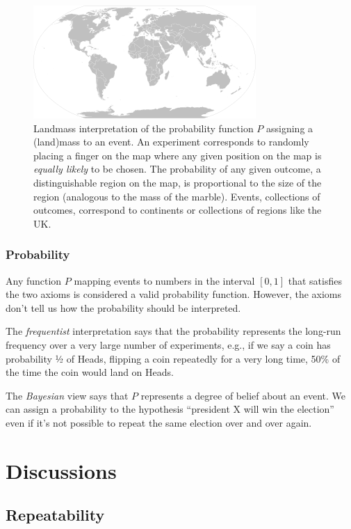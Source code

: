 \begin{figure}[h!]
\centering
\includegraphics[width=0.75\linewidth]{images/figure2}
\caption{%
Landmass interpretation of the probability function \(P\) assigning a (land)mass to an event.
An experiment corresponds to randomly placing a finger on the map where any given position 
on the map is \emph{equally likely} to be chosen. 
The probability of any given outcome, 
a distinguishable region on the map,
is proportional to the size of the region (analogous to the mass of the marble). 
Events, 
collections of outcomes, 
correspond to continents or collections of regions like the UK.
}
\label{fig:landmass}
\end{figure}

\subsubsection{Probability}

Any function \(P\) mapping events to numbers in the interval \([0,1]\) that satisfies the two axioms 
is considered a valid probability function. 
However, 
the axioms don't tell us how the probability should be interpreted.

The \emph{frequentist} interpretation says that the probability
represents the long-run frequency over a very large number of experiments, 
e.g., if we say a coin has probability ½ of Heads, 
flipping a coin repeatedly for a very long time, 
50\% of the time the coin would land on Heads.%

The \emph{Bayesian} view says that \(P\) represents a degree of belief about an event. 
We can assign a probability to the 
hypothesis ``president X will win the election'' even if it's not 
possible to repeat the same election over and over again.

\section{Discussions}

\subsection{Repeatability}

